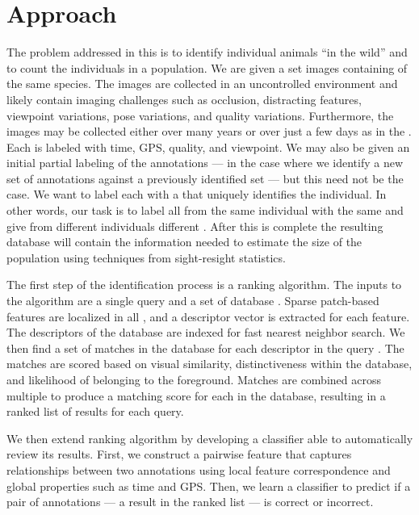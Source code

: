 \section{Approach}
    The problem addressed in this \thesis{} is to identify individual animals ``in the wild'' and to count the
      individuals in a population.
    We are given a set images containing \annots{} of the same species.
    The images are collected in an uncontrolled environment and likely contain imaging challenges such as
      occlusion, distracting features, viewpoint variations, pose variations, and quality variations.
    Furthermore, the images may be collected either over many years or over just a few days as in the \GZC{}.
    Each \annot{} is labeled with time, GPS, quality, and viewpoint.
    We may also be given an initial partial \name{} labeling of the annotations --- \eg{} in the case where we
      identify a new set of annotations against a previously identified set --- but this need not be the case.
    We want to label each \annot{} with a \glossterm{\name{}} that uniquely identifies the individual.
    In other words, our task is to label all \annots{} from the same individual with the same \name{} and give
      \annots{} from different individuals different \names{}.
    After this is complete the resulting database will contain the information needed to estimate the size of the
      population using techniques from sight-resight statistics.

    The first step of the identification process is a ranking algorithm. The inputs to the algorithm are a single query
    \annot{} and a set of database \annots{}. Sparse patch-based features are localized in all \annots{}, and a
    descriptor vector is extracted for each feature. The descriptors of the database \annots{} are indexed for fast
    nearest neighbor search. We then find a set of matches in the database for each descriptor in the query \annot{}.
    The matches are scored based on visual similarity, distinctiveness within the database, and likelihood of belonging
    to the foreground. Matches are combined across multiple \exemplar{} \annots{} to produce a matching score for each
    \name{} in the database, resulting in a ranked list of results for each query.

    We then extend ranking algorithm by developing a classifier able to automatically review its results.
    First, we construct a pairwise feature that captures relationships between two annotations using local
      feature correspondence and global properties such as time and GPS.
    Then, we learn a classifier to predict if a pair of annotations --- \ie{} a result in the ranked list --- is
      correct or incorrect.

